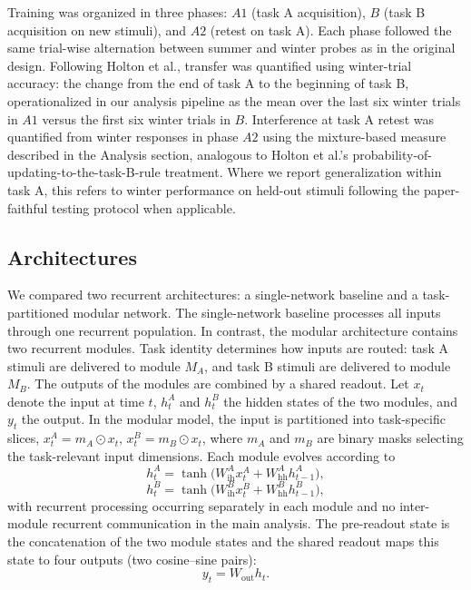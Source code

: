 \documentclass[letterpaper]{article}
\begin{document}
        Training was organized in three phases: \(A1\) (task A acquisition), \(B\) (task B acquisition on new stimuli), and \(A2\) (retest on task A). Each phase followed the same trial-wise alternation between summer and winter probes as in the original design. Following Holton et al., transfer was quantified using winter-trial accuracy: the change from the end of task A to the beginning of task B, operationalized in our analysis pipeline as the mean over the last six winter trials in \(A1\) versus the first six winter trials in \(B\). Interference at task A retest was quantified from winter responses in phase \(A2\) using the mixture-based measure described in the Analysis section, analogous to Holton et al.'s probability-of-updating-to-the-task-B-rule treatment. Where we report generalization within task A, this refers to winter performance on held-out stimuli following the paper-faithful testing protocol when applicable.
        
        \subsection{Architectures}
        
        We compared two recurrent architectures: a single-network baseline and a task-partitioned modular network. The single-network baseline processes all inputs through one recurrent population. In contrast, the modular architecture contains two recurrent modules. Task identity determines how inputs are routed: task A stimuli are delivered to module \(M_A\), and task B stimuli are delivered to module \(M_B\). The outputs of the modules are combined by a shared readout. Let \(x_t\) denote the input at time \(t\), \(h_t^A\) and \(h_t^B\) the hidden states of the two modules, and \(y_t\) the output. In the modular model, the input is partitioned into task-specific slices, $x_t^A = m_A \odot x_t$, $x_t^B = m_B \odot x_t$, where \(m_A\) and \(m_B\) are binary masks selecting the task-relevant input dimensions. Each module evolves according to
        \[
        h_t^A = \tanh\!\big(W_{\mathrm{ih}}^A x_t^A + W_{\mathrm{hh}}^A h_{t-1}^A\big),
        \]
        \[
        h_t^B = \tanh\!\big(W_{\mathrm{ih}}^B x_t^B + W_{\mathrm{hh}}^B h_{t-1}^B\big),
        \]
        with recurrent processing occurring separately in each module and no inter-module recurrent communication in the main analysis. The pre-readout state is the concatenation of the two module states
        and the shared readout maps this state to four outputs (two cosine--sine pairs):
        \[
        y_t = W_{\mathrm{out}} h_t.
        \]
        
\end{document}
